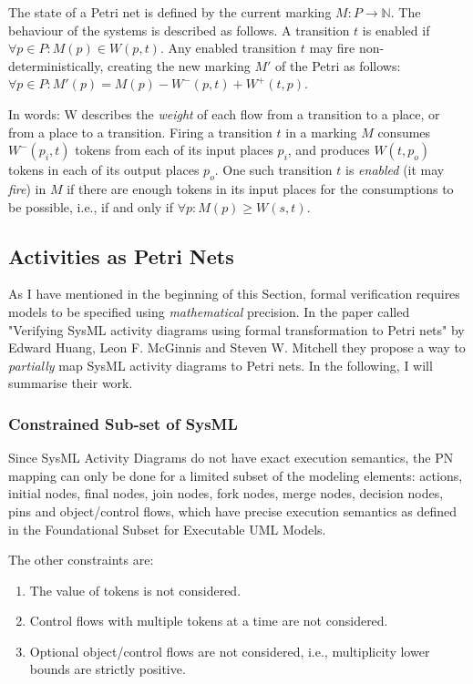 The state of a Petri net is defined by the current marking \( M : P \rightarrow \mathbb{N} \). The behaviour of the systems is described as follows. A transition \( t \) is enabled if \( \forall p \in P : M(p) \in W(p, t) \). Any enabled transition \(t\) may fire non-deterministically, creating the new marking \( M' \) of the Petri as follows: \( \forall p \in P : M'(p) = M(p) - W^-(p, t) + W^+(t, p) \).

In words: W describes the \emph{weight} of each flow from a transition to a place, or from a place to a transition. Firing a transition \(t\) in a marking \(M\) consumes \(W^-(p_i, t)\) tokens from each of its input places \(p_i\), and produces \(W(t, p_o)\) tokens in each of its output places \(p_o\). One such transition \(t\) is \emph{enabled} (it may \emph{fire}) in \(M\) if there are enough tokens in its input places for the consumptions to be possible, i.e., if and only if \( \forall p : M(p) \ge W(s, t)\).

\subsection{Activities as Petri Nets}

As I have mentioned in the beginning of this Section, formal verification requires models to be specified using \emph{mathematical} precision. In the paper called "Verifying SysML activity diagrams using formal transformation to Petri nets"\cite{https://doi.org/10.1002/sys.21524} by Edward Huang, Leon F. McGinnis and Steven W. Mitchell they propose a way to \emph{partially} map SysML activity diagrams to Petri nets. In the following, I will summarise their work.

\subsubsection*{Constrained Sub-set of SysML}

Since SysML Activity Diagrams do not have exact execution semantics\cite{euml}, the PN mapping can only be done for a limited subset of the modeling elements: actions, initial nodes, final nodes, join nodes, fork nodes, merge nodes, decision nodes, pins and object/control flows, which have precise execution semantics as defined in the Foundational Subset for Executable UML Models.\cite{fuml}

The other constraints are:

\begin{enumerate}
	\item The value of tokens is not considered.
	\item Control flows with multiple tokens at a time are not considered.
	\item Optional object/control flows are not considered, i.e., multiplicity lower bounds are strictly positive.
\end{enumerate}

